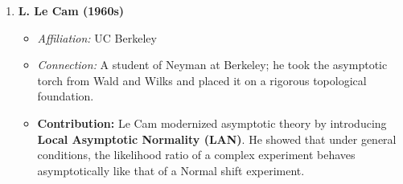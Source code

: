 \documentclass[
  letterpaper,
  DIV=11,
  numbers=noendperiod]{scrreprt}
\providecommand{\tightlist}{%
  \setlength{\itemsep}{0pt}\setlength{\parskip}{0pt}}
\renewcommand{\[}{\begin{equation}}
\renewcommand{\]}{\end{equation}}
\theoremstyle{definition}
\theoremstyle{plain}
\theoremstyle{plain}
\theoremstyle{plain}
\theoremstyle{definition}
\theoremstyle{plain}
\theoremstyle{remark}
\begin{document}
\begin{enumerate}
  \begin{itemize}
  \tightlist
  \item
    \emph{Affiliation:} Stanford University
  \item
    \emph{Connection:} Stein was a student of Wald at Columbia before
    moving to Stanford.
  \item
    \textbf{Contribution:} They discovered \textbf{Stein's Paradox},
    showing that the MLE (sample mean) is \textbf{inadmissible} for
    estimating the mean of a multivariate Normal distribution
    (\(p \ge 3\)). They introduced the \textbf{James-Stein Estimator}, a
    shrinkage estimator that dominates the MLE.
  \end{itemize}
\item
  \textbf{L. Le Cam (1960s)}

  \begin{itemize}
  \tightlist
  \item
    \emph{Affiliation:} UC Berkeley
  \item
    \emph{Connection:} A student of Neyman at Berkeley; he took the
    asymptotic torch from Wald and Wilks and placed it on a rigorous
    topological foundation.
  \item
    \textbf{Contribution:} Le Cam modernized asymptotic theory by
    introducing \textbf{Local Asymptotic Normality (LAN)}. He showed
    that under general conditions, the likelihood ratio of a complex
    experiment behaves asymptotically like that of a Normal shift
    experiment.
  \end{itemize}
\end{enumerate}
\end{document}
